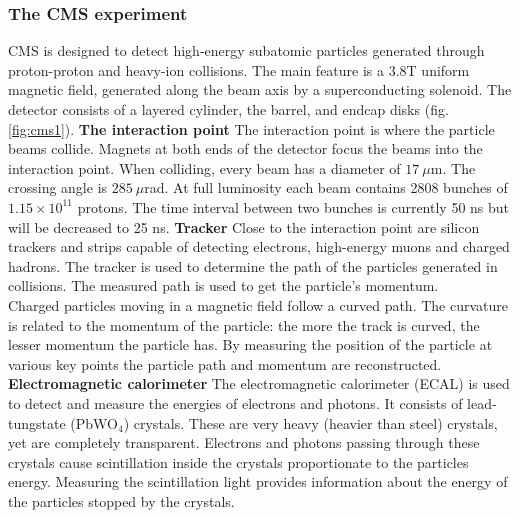 \documentclass[a4paper,12pt]{article}
\newcommand{\subscript}[1]{\ensuremath{_{\textrm{#1}}}}
\begin{document}
\subsubsection{The CMS experiment}
CMS \cite{cms} is designed to detect high-energy subatomic particles generated through proton-proton and heavy-ion collisions. The main feature is a 3.8T uniform magnetic field, generated along the beam axis by a superconducting solenoid. The detector consists of a layered cylinder, the barrel, and endcap disks (fig. \ref{fig:cms1}). 
\newline
\newline
\textbf{The interaction point}
\newline
The interaction point is where the particle beams collide. Magnets at both ends of the detector focus the beams into the interaction point. When colliding, every beam has a diameter of $17\ \mu$m. The crossing angle is $285\ \mu$rad. At full luminosity each beam contains 2808 bunches of $1.15\times10^{11}$ protons. The time interval between two bunches is currently 50 ns but will be decreased to 25 ns.
\newline
\newline
\textbf{Tracker}
\newline
Close to the interaction point are silicon trackers and strips capable of detecting electrons, high-energy muons and charged hadrons. The tracker is used to determine the path of the particles generated in collisions. The measured path is used to get the particle's momentum.
\\Charged particles moving in a magnetic field follow a curved path. The curvature is related to the momentum of the particle: the more the track is curved, the lesser momentum the particle has. By measuring the position of the particle at various key points the particle path and momentum are reconstructed. 
\newline
\newline
\textbf{Electromagnetic calorimeter}
\newline
The electromagnetic calorimeter (ECAL) is used to detect and measure the energies of electrons and photons. It consists of lead-tungstate (PbWO\subscript{4}) crystals. These are very heavy (heavier than steel) crystals, yet are completely transparent. Electrons and photons passing through these crystals cause scintillation inside the crystals proportionate to the particles energy. Measuring the scintillation light provides information about the energy of the particles stopped by the crystals.
\newline
\end{document}
